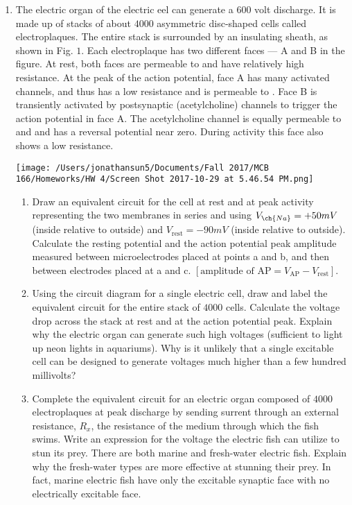 \documentclass[11pt]{article}
\begin{document}
\begin{enumerate}[label=\arabic*.]
\newpage
\item
The electric organ of the electric eel can generate a $600$ volt discharge. It is made up of stacks of about $4000$ asymmetric disc-shaped cells called electroplaques. The entire stack is surrounded by an insulating sheath, as shown in Fig. $1$. Each electroplaque has two different faces --- A and B in the figure. At rest, both faces are permeable to  and have relatively high resistance. At the peak of the action potential, face A has many activated  channels, and thus has a low resistance and is permeable to . Face B is transiently activated by postsynaptic (acetylcholine) channels to trigger the action potential in face A. The acetylcholine channel is equally permeable to  and  and has a reversal potential near zero. During activity this face also shows a low resistance.
\begin{center}
\texttt{[image: /Users/jonathansun5/Documents/Fall 2017/MCB 166/Homeworks/HW 4/Screen Shot 2017-10-29 at 5.46.54 PM.png]}
\end{center}
\begin{enumerate}[label=(\alph*)]
\item
Draw an equivalent circuit for the cell at rest and at peak activity representing the two membranes in series and using $V_{\ch{Na}} = +50 mV$ (inside relative to outside) and $V_{\text{rest}} = -90 mV$ (inside relative to outside). Calculate the resting potential and the action potential peak amplitude measured between microelectrodes placed at points a and b, and then between electrodes placed at a and c. $[\text{amplitude of AP} = V_{\text{AP}} - V_{\text{rest}}]$.







\item
Using the circuit diagram for a single electric cell, draw and label the equivalent circuit for the entire stack of $4000$ cells. Calculate the voltage drop across the stack at rest and at the action potential peak. Explain why the electric organ can generate such high voltages (sufficient to light up neon lights in aquariums). Why is it unlikely that a single excitable cell can be designed to generate voltages much higher than a few hundred millivolts?








\item
Complete the equivalent circuit for an electric organ composed of $4000$ electroplaques at peak discharge by sending surrent through an external resistance, $R_x$, the resistance of the medium through which the fish swims. Write an expression for the voltage the electric fish can utilize to stun its prey. There are both marine and fresh-water electric fish. Explain why the fresh-water types are more effective at stunning their prey. In fact, marine electric fish have only the excitable synaptic face with no electrically excitable face.








\end{enumerate}
\end{enumerate}
\end{document}
